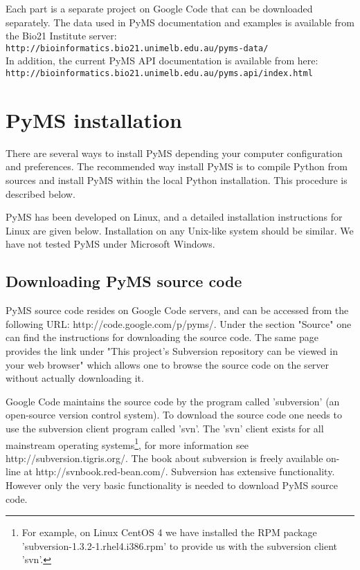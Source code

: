 Each part is a separate project on Google Code that can be downloaded
separately. The data used in PyMS documentation and examples is available
from the Bio21 Institute server:\\
{\tt http://bioinformatics.bio21.unimelb.edu.au/pyms-data/}\\
In addition, the current PyMS API documentation is available from here:\\
{\tt http://bioinformatics.bio21.unimelb.edu.au/pyms.api/index.html}

\section{PyMS installation}

There are several ways to install PyMS depending your computer configuration
and preferences. The recommended way install PyMS is to compile Python
from sources and install PyMS within the local Python installation. This
procedure is described below.

PyMS has been developed on Linux, and a detailed installation instructions
for Linux are given below. Installation on any Unix-like system should be
similar. We have not tested PyMS under Microsoft Windows.

\subsection{Downloading PyMS source code}

PyMS source code resides on Google Code servers, and can be accessed
from the following URL: http://code.google.com/p/pyms/. Under the
section "Source" one can find the instructions for downloading the
source code. The same page provides the link under "This project's
Subversion repository can be viewed in your web browser" which allows
one to browse the source code on the server without actually downloading
it.

Google Code maintains the source code by the program called 'subversion'
(an open-source version control system). To download the source code
one needs to use the subversion client program called 'svn'. The 'svn'
client exists for all mainstream operating systems\footnote{For example,
on Linux CentOS 4 we have installed the RPM package
'subversion-1.3.2-1.rhel4.i386.rpm' to provide us with the subversion
client 'svn'.}, for more information see http://subversion.tigris.org/.
The book about subversion is freely available on-line at
http://svnbook.red-bean.com/. Subversion has extensive functionality.
However only the very basic functionality is needed to download PyMS
source code.

